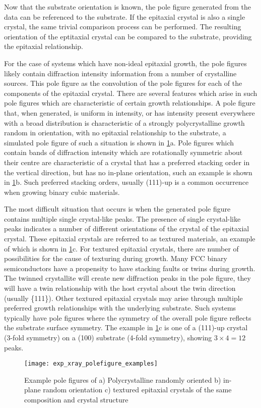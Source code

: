 Now that the substrate orientation is known, the pole figure generated from the data can be referenced to the substrate.
If the epitaxial crystal is also a single crystal, the same trivial comparison process can be performed.
The resulting orientation of the eptitaxial crystal can be compared to the substrate, providing the epitaxial relationship.

For the case of systems which have non-ideal epitaxial growth, the pole figures likely contain diffraction intensity information from a number of crystalline sources.
This pole figure as the convolution of the pole figures for each of the components of the epitaxial crystal.
There are several features which arise in such pole figures which are characteristic of certain growth relationships.
A pole figure that, when generated, is uniform in intensity, or has intensity present everywhere with a broad distribution is characteristic of a strongly polycrystalline growth random in orientation, with no epitaxial relationship to the substrate, a simulated pole figure of such a situation is shown in \cref{fig:exp_xray_polefigure_examples}a.
Pole figures which contain bands of diffraction intensity which are rotationally symmetric about their centre are characteristic of a crystal that has a preferred stacking order in the vertical direction, but has no in-plane orientation, such an example is shown in \cref{fig:exp_xray_polefigure_examples}b.
Such preferred stacking orders, usually (111)-up is a common occurrence when growing binary cubic materials.

The most difficult situation that occurs is when the generated pole figure contains multiple single crystal-like peaks.
The presence of single crystal-like peaks indicates a number of different orientations of the crystal of the epitaxial crystal.
These epitaxial crystals are referred to as textured materials, an example of which is shown in \cref{fig:exp_xray_polefigure_examples}c.
For textured epitaxial crystals, there are number of possibilities for the cause of texturing during growth.
Many FCC binary semiconductors have a propensity to have stacking faults or twins during growth.
The twinned crystallite will create new diffraction peaks in the pole figure, they will have a twin relationship with the host crystal about the twin direction (usually \{111\}).
Other textured epitaxial crystals may arise through multiple preferred growth relationships with the underlying substrate.
Such systems typically have pole figures where the symmetry of the overall pole figure reflects the substrate surface symmetry.
The example in \cref{fig:exp_xray_polefigure_examples}c is one of a (111)-up crystal (3-fold symmetry) on a (100) substrate (4-fold symmetry), showing \(3\times 4=12\) peaks.
\begin{figure}
 \centering \texttt{[image: exp\_xray\_polefigure\_examples]}
 \caption[Example simulated pole figures]{\label{fig:exp_xray_polefigure_examples}Example pole figures of a) Polycrystalline randomly oriented b) in-plane random orientation c) textured epitaxial crystals of the same composition and crystal structure}
\end{figure}

